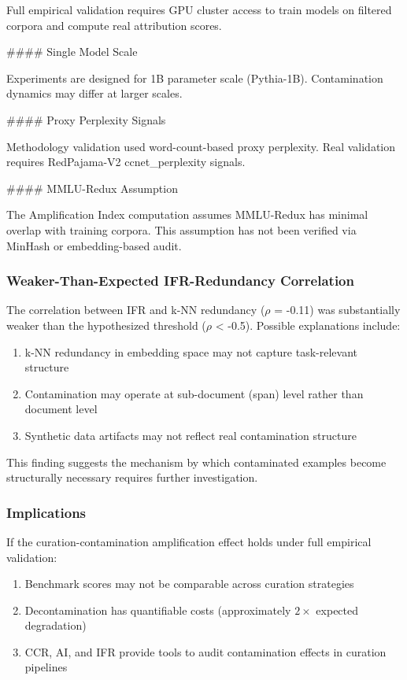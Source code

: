 Full empirical validation requires GPU cluster access to train models on filtered corpora and compute real attribution scores.

\#\#\#\# Single Model Scale

Experiments are designed for 1B parameter scale (Pythia-1B). Contamination dynamics may differ at larger scales.

\#\#\#\# Proxy Perplexity Signals

Methodology validation used word-count-based proxy perplexity. Real validation requires RedPajama-V2 ccnet\_perplexity signals.

\#\#\#\# MMLU-Redux Assumption

The Amplification Index computation assumes MMLU-Redux has minimal overlap with training corpora. This assumption has not been verified via MinHash or embedding-based audit.

\subsubsection{Weaker-Than-Expected IFR-Redundancy Correlation}

The correlation between IFR and k-NN redundancy ($\rho$ = -0.11) was substantially weaker than the hypothesized threshold ($\rho$ < -0.5). Possible explanations include:

\begin{enumerate}
\item k-NN redundancy in embedding space may not capture task-relevant structure
\item Contamination may operate at sub-document (span) level rather than document level
\item Synthetic data artifacts may not reflect real contamination structure
\end{enumerate}

This finding suggests the mechanism by which contaminated examples become structurally necessary requires further investigation.

\subsubsection{Implications}

If the curation-contamination amplification effect holds under full empirical validation:

\begin{enumerate}
\item Benchmark scores may not be comparable across curation strategies
\item Decontamination has quantifiable costs (approximately $2\times$ expected degradation)
\item CCR, AI, and IFR provide tools to audit contamination effects in curation pipelines
\end{enumerate}

